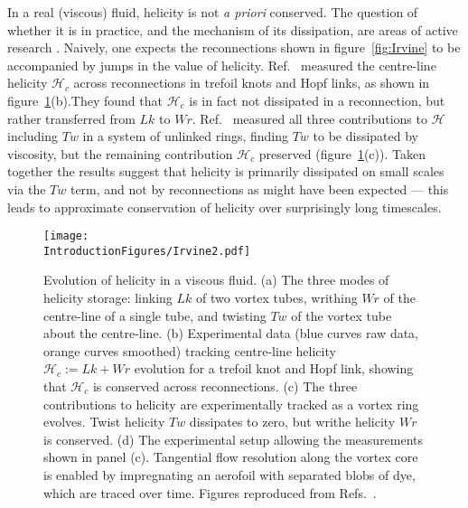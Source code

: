 In a real (viscous) fluid, helicity is not \emph{a priori} conserved. The question of whether it is in practice, and the mechanism of its dissipation, are areas of active research \citep{Kleckner2013, Scheeler2014,Scheeler2016}. Naively, one expects the reconnections shown in figure~\ref{fig:Irvine} to be accompanied by jumps in the value of helicity. Ref.~\citep{Scheeler2014} measured the centre-line helicity $\mathcal{H}_c$ across reconnections in trefoil knots and Hopf links, as shown in figure~\ref{fig:Irvine2}(b).They found that $\mathcal{H}_c$ is in fact not dissipated in a reconnection, but rather transferred from $Lk$ to $Wr$. Ref.~\citep{Scheeler2016} measured all three contributions to $\mathcal{H}$ including $Tw$ in a system of unlinked rings, finding $Tw$ to be dissipated by viscosity, but the remaining contribution $\mathcal{H}_c$ preserved (figure~\ref{fig:Irvine2}(c)). Taken together the results suggest that helicity is primarily dissipated on small scales via the $Tw$ term, and not by reconnections as might have been expected --- this leads to approximate conservation of helicity over surprisingly long timescales.
\begin{figure}[htbp]
\centering
\texttt{[image: \\IntroductionFigures/Irvine2.pdf]}
\caption{Evolution of helicity in a viscous fluid. (a) The three modes of helicity storage: linking $Lk$ of two vortex tubes, writhing $Wr$ of the centre-line of a single tube, and twisting $Tw$ of the vortex tube about the centre-line. (b) Experimental data (blue curves raw data, orange curves smoothed) tracking centre-line helicity $\mathcal{H}_c := Lk + Wr$ evolution for a trefoil knot and Hopf link, showing that $\mathcal{H}_c$ is conserved across reconnections. (c) The three contributions to helicity are experimentally tracked as a vortex ring evolves. Twist helicity $Tw$ dissipates to zero, but writhe helicity $Wr$ is conserved. (d) The experimental setup allowing the measurements shown in panel (c). Tangential flow resolution along the vortex core is enabled by impregnating an aerofoil with separated blobs of dye, which are traced over time. Figures reproduced from Refs.~\citep{Scheeler2014, Scheeler2016}. }
\label{fig:Irvine2}
\end{figure}

